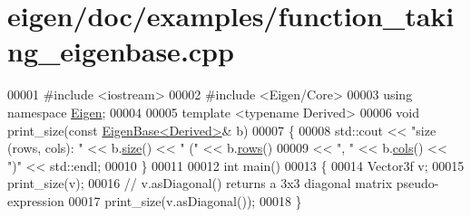 \hypertarget{eigen_2doc_2examples_2function__taking__eigenbase_8cpp_source}{}\section{eigen/doc/examples/function\+\_\+taking\+\_\+eigenbase.cpp}
\label{eigen_2doc_2examples_2function__taking__eigenbase_8cpp_source}

\begin{DoxyCode}
00001 \textcolor{preprocessor}{#include <iostream>}
00002 \textcolor{preprocessor}{#include <Eigen/Core>}
00003 \textcolor{keyword}{using namespace }\hyperlink{namespace_eigen}{Eigen};
00004 
00005 \textcolor{keyword}{template} <\textcolor{keyword}{typename} Derived>
00006 \textcolor{keywordtype}{void} print\_size(\textcolor{keyword}{const} \hyperlink{group___core___module_struct_eigen_1_1_eigen_base}{EigenBase<Derived>}& b)
00007 \{
00008   std::cout << \textcolor{stringliteral}{"size (rows, cols): "} << b.\hyperlink{group___core___module_ac2c9348df3bb9c0044dbae6c278a8977}{size}() << \textcolor{stringliteral}{" ("} << b.\hyperlink{group___core___module_a8141320ba8df384426c298b32b000d8e}{rows}()
00009             << \textcolor{stringliteral}{", "} << b.\hyperlink{group___core___module_a7b0b45c7351847696c911ce8aa2abbdb}{cols}() << \textcolor{stringliteral}{")"} << std::endl;
00010 \}
00011 
00012 \textcolor{keywordtype}{int} main()
00013 \{
00014     Vector3f v;
00015     print\_size(v);
00016     \textcolor{comment}{// v.asDiagonal() returns a 3x3 diagonal matrix pseudo-expression}
00017     print\_size(v.asDiagonal());
00018 \}
\end{DoxyCode}
